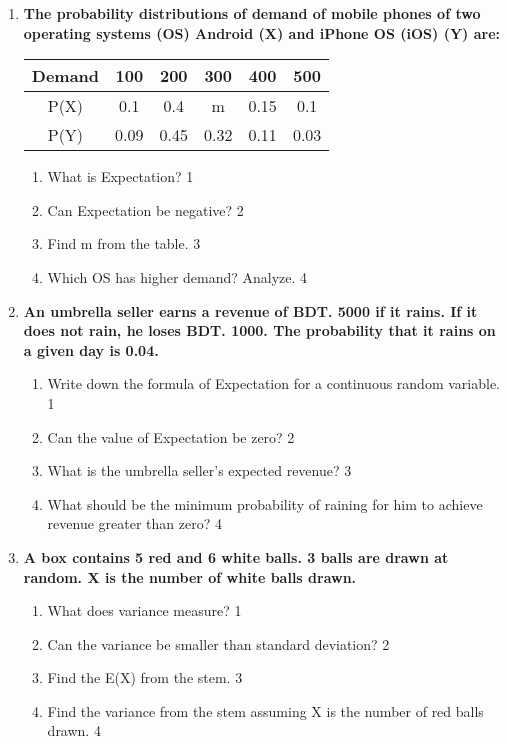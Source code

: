 \documentclass[a4paper,oneside, margin=1.4in]{book}
\begin{document}
\begin{enumerate}
   \item
	  \textbf{The probability distributions of demand of mobile phones of two operating systems (OS) Android (X) and iPhone OS (iOS) (Y) are:} 
	  
	    \begin{table}[h]
	    	  \begin{center}
\begin{tabular}{c|c|c|c|c|c}
Demand & 100  & 200  & 300  & 400  & 500  \\ \hline
P(X)   & 0.1  & 0.4  & m    & 0.15 & 0.1  \\ \hline
P(Y)   & 0.09 & 0.45 & 0.32 & 0.11 & 0.03
\end{tabular}
	  \end{center}
\end{table}
  
  \begin{enumerate}
    \item
	What is Expectation? \hfill 1
    \item
	Can Expectation be negative? \hfill 2
    \item  
	Find m from the table. \hfill 3
    \item
	Which OS has higher demand? Analyze. \hfill 4
  \end{enumerate}

\item
	  \textbf{An umbrella seller earns a revenue of BDT. 5000 if it rains. If it does not rain, he loses BDT. 1000. The probability that it rains on a given day is 0.04.} 
  
  \begin{enumerate}
    \item
	Write down the formula of Expectation for a continuous random variable. \hfill 1
    \item
	Can the value of Expectation be zero? \hfill 2
    \item  
	What is the umbrella seller's expected revenue? \hfill 3
    \item
	What should be the minimum probability of raining for him to achieve revenue greater than zero? \hfill 4
  \end{enumerate}
  
     \item
	  \textbf{A box contains 5 red and 6 white balls. 3 balls are drawn at random. X is the number of white balls drawn.} 
  
  \begin{enumerate}
    \item
	What does variance measure? \hfill 1
    \item
	Can the variance be smaller than standard deviation? \hfill 2
    \item  
	Find the E(X) from the stem. \hfill 3
    \item
	Find the variance from the stem assuming X is the number of red balls drawn. \hfill 4
  \end{enumerate}
  

\end{enumerate}
\end{document}
